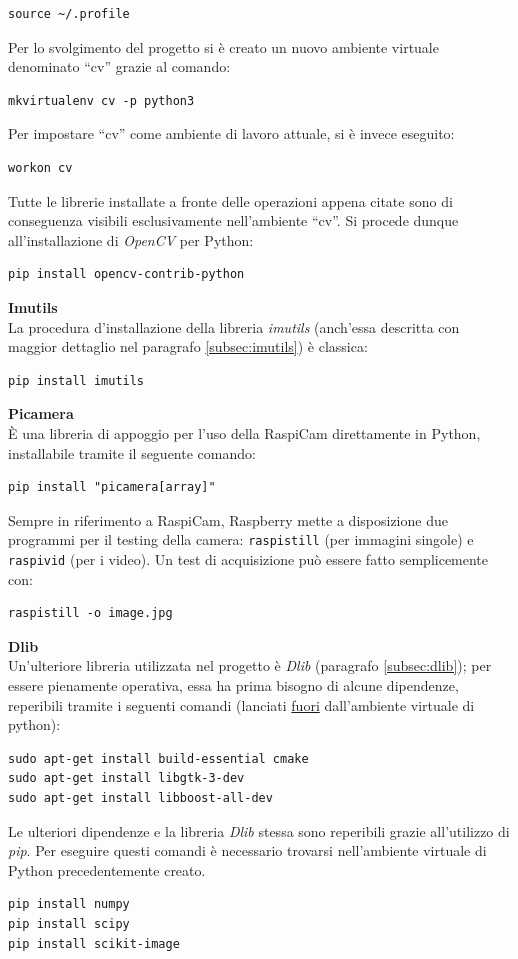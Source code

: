 \documentclass[12pt]{article}
\newcommand{\quotes}[1]{``#1''}
\begin{document}
\begin{lstlisting}
source ~/.profile
\end{lstlisting}
Per lo svolgimento del progetto si è creato un nuovo ambiente virtuale denominato \quotes{cv} grazie al comando:
\begin{lstlisting}
mkvirtualenv cv -p python3
\end{lstlisting}
Per impostare \quotes{cv} come ambiente di lavoro attuale, si è invece eseguito:
\begin{lstlisting}
workon cv
\end{lstlisting}
Tutte le librerie installate a fronte delle operazioni appena citate sono di conseguenza visibili esclusivamente nell'ambiente \quotes{cv}. Si procede dunque all'installazione di \textit{OpenCV} per Python:
\begin{lstlisting}
pip install opencv-contrib-python
\end{lstlisting}

\vspace{0.5cm}
\textbf{Imutils}\\
La procedura d'installazione della libreria \textit{imutils} (anch'essa descritta con maggior dettaglio nel paragrafo \ref{subsec:imutils}) è classica:
\begin{lstlisting}
pip install imutils
\end{lstlisting}

\vspace{0.5cm}
\textbf{Picamera}\\
È una libreria di appoggio per l'uso della RaspiCam direttamente in Python, installabile tramite il seguente comando:
\begin{lstlisting}
pip install "picamera[array]"
\end{lstlisting}
Sempre in riferimento a RaspiCam, Raspberry mette a disposizione due programmi per il testing della camera: \texttt{raspistill} (per immagini singole) e \texttt{raspivid} (per i video). Un test di acquisizione può essere fatto semplicemente con:
\begin{lstlisting}
raspistill -o image.jpg
\end{lstlisting}

\vspace{0.5cm}
\textbf{Dlib}\\
Un'ulteriore libreria utilizzata nel progetto è \textit{Dlib} (paragrafo \ref{subsec:dlib}); per essere pienamente operativa, essa ha prima bisogno di alcune dipendenze, reperibili tramite i seguenti comandi (lanciati \underline{fuori} dall'ambiente virtuale di python):
\begin{lstlisting}
sudo apt-get install build-essential cmake
sudo apt-get install libgtk-3-dev
sudo apt-get install libboost-all-dev
\end{lstlisting}
Le ulteriori dipendenze e la libreria \textit{Dlib} stessa sono reperibili grazie all'utilizzo di \textit{pip}. Per eseguire questi comandi è necessario trovarsi nell'ambiente virtuale di Python precedentemente creato.
\begin{lstlisting}
pip install numpy
pip install scipy
pip install scikit-image
\end{lstlisting}
\end{document}
